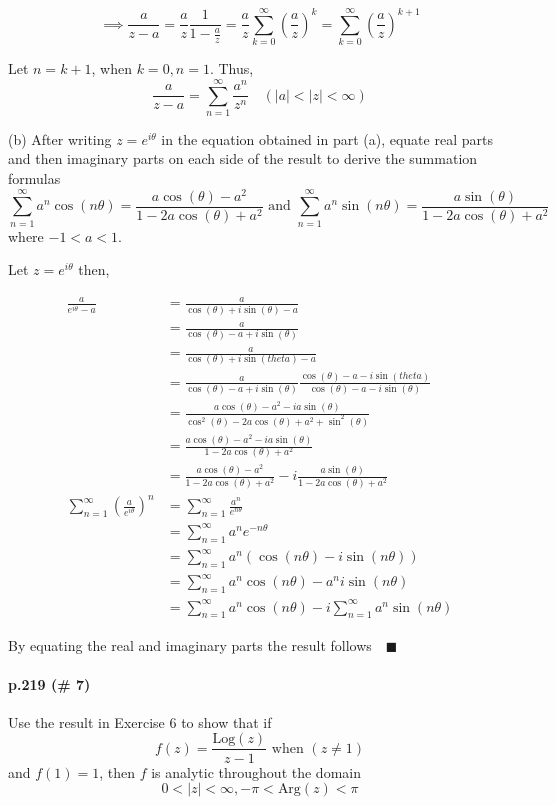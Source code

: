 \documentclass{article}
\begin{document}
\[\implies \frac{a}{z-a} = \frac{a}{z}\frac{1}{1-\frac{a}{z}} =
\frac{a}{z}\sum_{k=0}^{\infty} \left( \frac{a}{z} \right)^k =
\sum_{k=0}^{\infty} \left( \frac{a}{z} \right)^{k+1}\]

Let $n = k+1$, when $k = 0, n = 1$. Thus,
\[\frac{a}{z-a} =\sum_{n = 1}^\infty \frac{a^n}{z^n}\quad
  (|a|<|z|<\infty)\]


(b) After writing $z = e^{i\theta}$ in the equation obtained in part (a), equate real parts and
then imaginary parts on each side of the result to derive the summation formulas
\[\sum_{n = 1}^\infty a^n\cos(n\theta) =
  \frac{a\cos(\theta)-a^2}{1-2a\cos(\theta)+a^2} \text{ and }\sum_{n = 1}^\infty a^n\sin(n\theta) = \frac{a\sin(\theta)}{1-2a\cos(\theta)+a^2}\]
where $-1<a<1$.

Let $z = e^{i\theta}$ then,

\begin{align*} \frac{a}{e^{i\theta} - a} &= \frac{a}{\cos(\theta) + i\sin(\theta)
    -a} \\ &= \frac{a}{\cos(\theta) - a + i\sin(\theta)} \\ &= \frac{a}{\cos(\theta) + i\sin(theta)
    -a}\\ &= \frac{a}{\cos(\theta) - a + i\sin(\theta)}\frac{\cos(\theta)
    -a - i\sin(theta)}{\cos(\theta) - a - i\sin(\theta)}\\ &=
    \frac{a\cos(\theta)-a^2 -i a\sin(\theta)}{\cos^2(\theta)-2a\cos(\theta) +a^2 +
      \sin^2(\theta)}\\ &= \frac{a\cos(\theta) -a^2 -
                          ia\sin(\theta)}{1-2a\cos(\theta)+a^2}\\
  &= \frac{a\cos(\theta) -a^2}{1-2a\cos(\theta)+a^2} -i
                          \frac{a\sin(\theta)}{1-2a\cos(\theta)+a^2}\\
\sum_{n=1}^\infty \left(\frac{a}{e^{i\theta}}\right)^n &= \sum_{n=1}^\infty \frac{a^n}{e^{n\theta}}\\
  &= \sum_{n=1}^\infty a^ne^{-n\theta}\\
                                         &= \sum_{n=1}^\infty a^n(\cos(n\theta)-i\sin(n\theta))\\
                                         &= \sum_{n=1}^\infty
                                           a^n\cos(n\theta)-a^ni\sin(n\theta)\\
  &= \sum_{n=1}^\infty
                                           a^n\cos(n\theta)
    -i\sum_{n=1}^\infty a^n\sin(n\theta)
\end{align*}

By equating the real and imaginary parts the result follows$\quad
\blacksquare$

\paragraph{p.219 \color{blue}(\# 7)\color{black}}

Use the result in Exercise 6 to show that if
\[f(z) = \frac{\text{Log}(z)}{z-1}\text{ when }(z\neq 1)\]
and $f(1)=1 $, then $f$ is analytic throughout the domain
\[0<|z|<\infty, -\pi <\text{Arg}(z)<\pi\]
\end{document}
